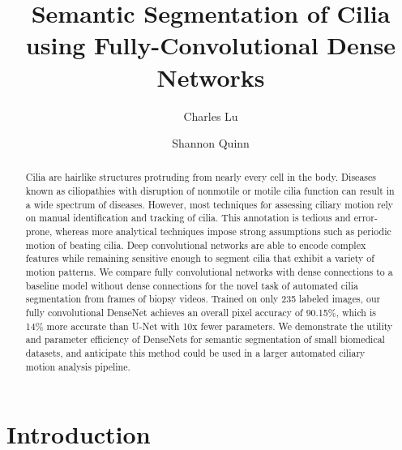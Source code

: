 \documentclass{llncs}
\begin{document}
\frontmatter          %
\pagestyle{headings}  %
\mainmatter              %


\title{Semantic Segmentation of Cilia using Fully-Convolutional Dense Networks}
\author{Charles Lu \and
Shannon Quinn}
\tocauthor{}
\maketitle              %


\begin{abstract}
Cilia are hairlike structures protruding from nearly every cell in the body. Diseases known as ciliopathies with disruption of nonmotile or motile cilia function can result in a wide spectrum of diseases. However, most techniques for assessing ciliary motion rely on manual identification and tracking of cilia. This annotation is tedious and error-prone, whereas more analytical techniques impose strong assumptions such as periodic motion of beating cilia. Deep convolutional networks are able to encode complex features while remaining sensitive enough to segment cilia that exhibit a variety of motion patterns. We compare fully convolutional networks with dense connections to a baseline model without dense connections for the novel task of automated cilia segmentation from frames of biopsy videos. Trained on only 235 labeled images, our fully convolutional DenseNet achieves an overall pixel accuracy of 90.15\%, which is 14\% more accurate than U-Net with 10x fewer parameters. We demonstrate the utility and parameter efficiency of DenseNets for semantic segmentation of small biomedical datasets, and anticipate this method could be used in a larger automated ciliary motion analysis pipeline.

\end{abstract}


\section{Introduction}
\end{document}
